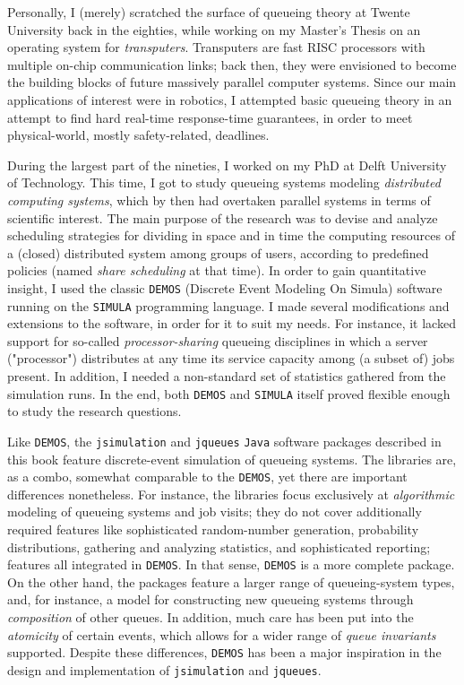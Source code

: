 Personally,
  I (merely) scratched the surface of queueing theory
  at Twente University back in the eighties,
  while working on my Master's Thesis
  on an operating system for {\em transputers}.
Transputers are fast RISC processors
  with multiple on-chip communication links;
  back then, they were envisioned to become the building blocks
  of future massively parallel computer systems.
Since our main applications of interest were in robotics,
  I attempted basic queueing theory in an attempt to find
  hard real-time response-time guarantees,
  in order to meet physical-world, mostly safety-related, deadlines.

During the largest part of the nineties,
  I worked on my PhD at Delft University of Technology.
This time,
  I got to study queueing systems modeling
  {\em distributed computing systems},
  which by then had overtaken parallel systems
  in terms of scientific interest.
The main purpose of the research was to devise
  and analyze scheduling strategies for
  dividing in space and in time
  the computing resources of a
  (closed) distributed system among groups of users,
  according to predefined policies (named
  {\em share scheduling\/} at that time).
In order to gain quantitative insight,
  I used the classic \lstinline|DEMOS|
  (Discrete Event Modeling On Simula) software
  running on the \lstinline|SIMULA|
  programming language.
I made several modifications and extensions to the software,
  in order for it to suit my needs.
For instance,
  it lacked support for so-called
  {\em processor-sharing\/}
  queueing disciplines in which
  a server ("processor") distributes
  at any time its service capacity
  among (a subset of) jobs present.
In addition,
  I needed a non-standard set of statistics
  gathered from the simulation runs.
In the end,
  both \lstinline|DEMOS| and \lstinline|SIMULA| itself
  proved flexible enough to study the research questions.

Like \lstinline|DEMOS|,
  the \lstinline|jsimulation|
  and \lstinline|jqueues|
  \lstinline|Java|
  software packages described in this book
  feature discrete-event simulation
  of queueing systems.
The libraries are, as a combo,
  somewhat comparable to
  the \lstinline|DEMOS|,
  yet there are important differences nonetheless.
For instance, the libraries
  focus exclusively at {\em algorithmic\/}
  modeling of queueing systems and job visits;
  they do not cover additionally required features
  like sophisticated random-number generation,
  probability distributions,
  gathering and analyzing statistics,
  and sophisticated reporting;
  features all integrated in \lstinline|DEMOS|.
In that sense, \lstinline|DEMOS|
  is a more complete package.
On the other hand,
  the packages feature a larger range of
  queueing-system types,
  and, for instance,
  a model for constructing new queueing systems
  through {\em composition\/} of
  other queues.
In addition,
  much care has been put into the
  {\em atomicity\/} of certain events,
  which allows for a wider range of
  {\em queue invariants\/} supported.
Despite these differences,
  \lstinline|DEMOS| has been a major inspiration
  in the design and implementation of
  \lstinline|jsimulation|
  and \lstinline|jqueues|.

